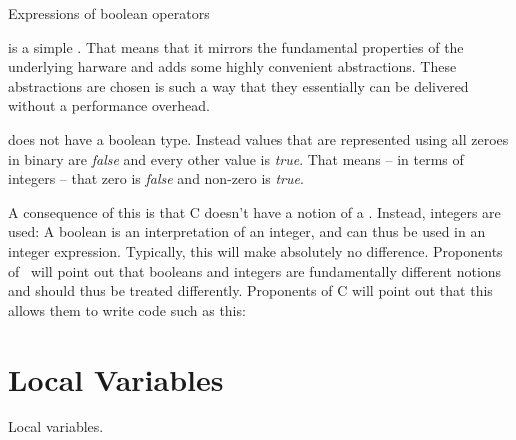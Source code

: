 
\csharpsubsection{\csharp}

\begin{syntaxfloat}
  
  \caption{Expressions of boolean operators}
  \label{syntax:prim:bool:ops}
\end{syntaxfloat}



 is a simple . That means that it mirrors the fundamental properties of the underlying harware and adds some highly convenient abstractions. These abstractions are chosen is such a way that they essentially can be delivered without a performance overhead.

 does not have a boolean type. Instead  values that are represented using all zeroes in binary are \textsl{false} and every other value is \textsl{true}. That means -- in terms of integers -- that zero is \textsl{false} and non-zero is \textsl{true}. %

A consequence of this is that C doesn't have a notion of a . Instead, integers are used: A boolean is an interpretation of an integer, and can thus be used in an integer expression. Typically, this will make absolutely no difference. Proponents of \csharp\ will point out that booleans and integers are fundamentally different notions and should thus be treated differently. Proponents of C will point out that this allows them to write code such as this:



\section{Local Variables}
\csharpsubsection{\csharp}

\begin{syntaxfloat}
  
  \caption{Local variables.}
  \label{syntax:prim:vars:locals}
\end{syntaxfloat}

